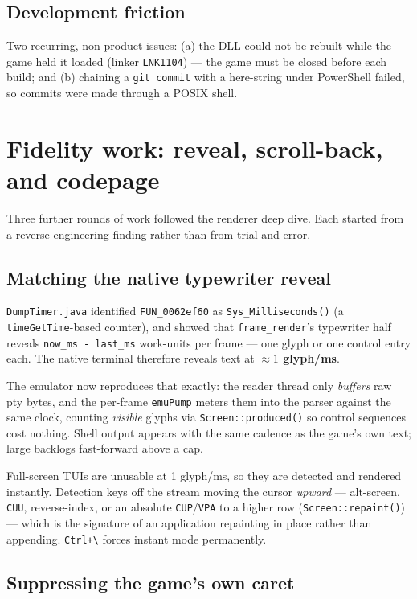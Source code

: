 \documentclass[11pt]{article}
\newcommand{\ic}[1]{\texttt{#1}}
\begin{document}
\subsection{Development friction}
Two recurring, non-product issues: (a) the DLL could not be rebuilt while the game held
it loaded (linker \texttt{LNK1104}) --- the game must be closed before each build; and
(b) chaining a \texttt{git commit} with a here-string under PowerShell failed, so commits
were made through a POSIX shell.

\section{Fidelity work: reveal, scroll-back, and codepage}
\label{sec:scrollback}

Three further rounds of work followed the renderer deep dive. Each started from a
reverse-engineering finding rather than from trial and error.

\subsection{Matching the native typewriter reveal}

\texttt{DumpTimer.java} identified \texttt{FUN_0062ef60} as \ic{Sys_Milliseconds()}
(a \ic{timeGetTime}-based counter), and showed that \ic{frame_render}'s typewriter half
reveals \ic{now_ms - last_ms} work-units per frame --- one glyph or one control entry
each. The native terminal therefore reveals text at \textbf{${\approx}1$ glyph/ms}.

The emulator now reproduces that exactly: the reader thread only \emph{buffers} raw pty
bytes, and the per-frame \ic{emuPump} meters them into the parser against the same
clock, counting \emph{visible} glyphs via \ic{Screen::produced()} so control sequences
cost nothing. Shell output appears with the same cadence as the game's own text; large
backlogs fast-forward above a cap.

Full-screen TUIs are unusable at 1 glyph/ms, so they are detected and rendered
instantly. Detection keys off the stream moving the cursor \emph{upward} --- alt-screen,
\ic{CUU}, reverse-index, or an absolute \ic{CUP}/\ic{VPA} to a higher row
(\ic{Screen::repaint()}) --- which is the signature of an application repainting in
place rather than appending. \ic{Ctrl+\textbackslash} forces instant mode permanently.

\subsection{Suppressing the game's own caret}
\end{document}
